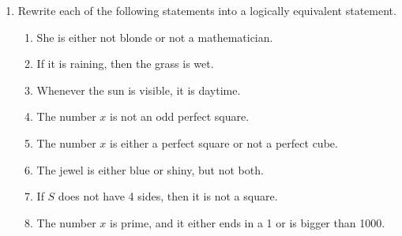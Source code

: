 \begin{enumerate}
    \item Rewrite each of the following statements into a logically equivalent statement.
  \begin{enumerate}
      \item She is either not blonde or not a mathematician.
      \item If it is raining, then the grass is wet.
      \item Whenever the sun is visible, it is daytime.
      \item The number $x$ is not an odd perfect square.
      \item The number $x$ is either a perfect square or not a perfect cube.
      \item The jewel is either blue or shiny, but not both.
      \item If $S$ does not have 4 sides, then it is not a square.
      \item The number $x$ is prime, and it either ends in a 1 or is bigger than 1000.
  \end{enumerate}
\end{enumerate}
